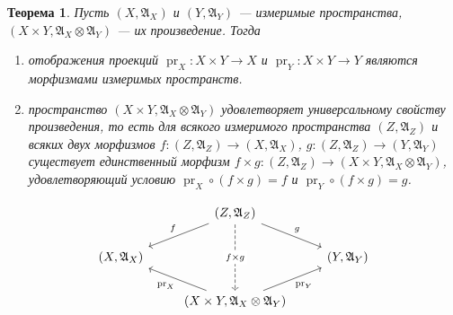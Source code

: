 \documentclass[12pt]{article}
\newtheorem{theorem}{Теорема}
\numberwithin{theorem}{section}
\theoremstyle{definition}
\newcommand{\setsigmaalg}{\mathfrak{A}}
\newcommand{\pr}{\operatorname{pr}}
\begin{document}
	\begin{theorem} \label{product of measurable spaces}
		Пусть $ (X, \setsigmaalg_X) $ и $ (Y, \setsigmaalg_Y) $ --- измеримые пространства,
		$ (X \times Y, \setsigmaalg_X \otimes \setsigmaalg_Y) $ --- их произведение.
		Тогда
		\begin{enumerate}
			\item отображения проекций $ \pr_X \colon X \times Y \to X $
			и $ \pr_Y \colon X \times Y \to Y $ являются морфизмами измеримых пространств.
			\item пространство $ (X \times Y, \setsigmaalg_X \otimes \setsigmaalg_Y) $ удовлетворяет универсальному свойству произведения,
			то есть для всякого измеримого пространства $ (Z, \setsigmaalg_Z) $ 
			и всяких двух морфизмов $ f \colon (Z, \setsigmaalg_Z) \to (X, \setsigmaalg_X) $,
			$ g \colon (Z, \setsigmaalg_Z) \to (Y, \setsigmaalg_Y) $
			существует единственный морфизм $ f \times g \colon (Z, \setsigmaalg_Z) \to (X \times Y, \setsigmaalg_X \otimes \setsigmaalg_Y) $,
			удовлетворяющий условию $ \pr_X \circ (f \times g) = f $ и $ \pr_Y \circ (f \times g) = g $.
		\end{enumerate}
		$$ \begin{tikzcd}
			& (Z, \setsigmaalg_Z) \ar{dl}[above left]{f} \ar{dr}{g} \ar[dashed]{dd}[description]{f \times g} & \\
			(X, \setsigmaalg_X) &  & (Y, \setsigmaalg_Y) \\
			& (X \times Y, \setsigmaalg_X \otimes \setsigmaalg_Y) \ar{ul}{\pr_X} \ar{ur}[below right]{\pr_Y} &
		\end{tikzcd} $$
	\end{theorem}
	
\end{document}
